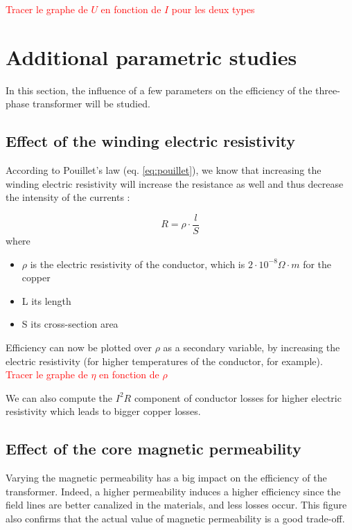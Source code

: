 \documentclass[12pt,a4paper]{report}
\begin{document}
\textcolor{red}{Tracer le graphe de $U$ en fonction de $I$ pour les deux types}

\section{Additional parametric studies}

In this section, the influence of a few parameters on the efficiency of the three-phase transformer will be studied.

\subsection{Effect of the winding electric resistivity}
According to Pouillet's law (eq. \ref{eq:pouillet}), we know that increasing the winding electric resistivity will increase the resistance as well and thus decrease the intensity of the currents :

\begin{equation}
    R = \rho \cdot \frac{l}{S}
    \label{eq:pouillet}
\end{equation}
where 
\begin{itemize}
    \item $\rho$ is the electric resistivity of the conductor, which is $2 \cdot 10^{-8} \Omega \cdot m$ for the copper
    \item L its length 
    \item S its cross-section area
\end{itemize}

Efficiency can now be plotted over $\rho$ as a secondary variable, by increasing the electric resistivity (for higher temperatures of the conductor, for example).\\

\textcolor{red}{Tracer le graphe de $\eta$ en fonction de $\rho$}

We can also compute the $I^2R$ component of conductor losses for higher electric resistivity which leads to bigger copper losses.

\subsection{Effect of the core magnetic permeability}
Varying the magnetic permeability has a big impact on the efficiency of the transformer. Indeed, a higher permeability induces a higher efficiency since the field lines are better canalized in the materials, and less losses occur. This figure also confirms that the actual value of magnetic permeability is a good trade-off.
\end{document}

